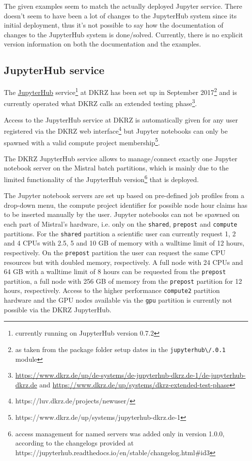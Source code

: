 The given examples seem to match the actually deployed Jupyter service.
There doesn't seem to have been a lot of changes to the JupyterHub system since its initial deployment, thus it's not possible to say how the documentation of changes to the JupyterHub system is done/solved.
Currently, there is no explicit version information on both the documentation and the examples.

\subsection{JupyterHub service}

The \href{https://jupyterhub.dkrz.de/}{JupyterHub} service\footnote{currently running on JupyterHub version 0.7.2} at DKRZ has been set up in September 2017\footnote{as taken from the package folder setup dates in the \verb|jupyterhub\/.0.1| module} and is currently operated what DKRZ calls an extended testing phase\footnote{\url{https://www.dkrz.de/up/de-systems/de-jupyterhub-dkrz.de-1/de-jupyterhub-dkrz.de} and \url{https://www.dkrz.de/up/systems/dkrz-extended-test-phase}}.

Access to the JupyterHub service at DKRZ is automatically given for any user registered via the DKRZ web interface\footnote{https://luv.dkrz.de/projects/newuser/} but Jupyter notebooks can only be spawned with a valid compute project membership\footnote{https://www.dkrz.de/up/systems/jupyterhub-dkrz.de-1}.

The DKRZ JupyterHub service allows to manage/connect exactly one Jupyter notebook server on the Mistral batch partitions, which is mainly due to the limited functionality of the JupyterHub version\footnote{access management for named servers was added only in version 1.0.0, according to the changelogs provided at https://jupyterhub.readthedocs.io/en/stable/changelog.html#id3} that is deployed.

The Jupyter notebook servers are set up based on pre-defined job profiles from a drop-down menu, the compute project identifier for possible node hour claims has to be inserted manually by the user.
Jupyter notebooks can not be spawned on each part of Mistral's hardware, i.e. only on the \verb|shared|, \verb|prepost| and \verb|compute| partitions.
For the \verb|shared| partition a scientific user can currently request 1, 2 and 4 CPUs with 2.5, 5 and 10 GB of memory with a walltime limit of 12 hours, respectively.
On the \verb|prepost| partition the user can request the same CPU resources but with doubled memory, respectively.
A full node with 24 CPUs and 64 GB with a walltime limit of 8 hours can be requested from the \verb|prepost| partition, a full node with 256 GB of memory from the \verb|prepost| partition for 12 hours, respectively.
Access to the higher performance \verb|compute2| partition hardware and the GPU nodes available via the \verb|gpu| partition is currently not possible via the DKRZ JupyterHub.

